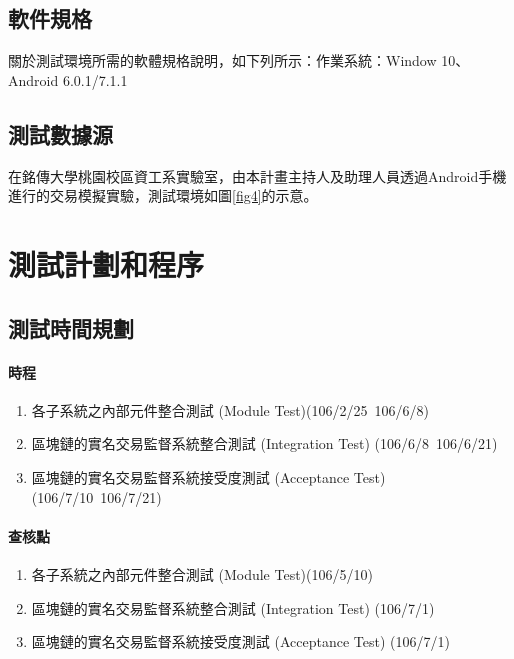  		\subsection{軟件規格}
 		關於測試環境所需的軟體規格說明，如下列所示：作業系統：Window 10、Android 6.0.1/7.1.1

 		\subsection{測試數據源}
 		在銘傳大學桃園校區資工系實驗室，由本計畫主持人及助理人員透過Android手機進行的交易模擬實驗，測試環境如圖\ref{fig4}的示意。

 	\section{測試計劃和程序}

 		\subsection{測試時間規劃}

 		\paragraph{時程}

 			\begin{enumerate}
 				\item 各子系統之內部元件整合測試 (Module Test)(106/2/25~106/6/8)
 				\item 區塊鏈的實名交易監督系統整合測試 (Integration Test) (106/6/8~106/6/21)
 				\item 區塊鏈的實名交易監督系統接受度測試 (Acceptance Test) (106/7/10~106/7/21)
			\end{enumerate}

		\paragraph{查核點}

			\begin{enumerate}
 				\item 各子系統之內部元件整合測試 (Module Test)(106/5/10)
 				\item 區塊鏈的實名交易監督系統整合測試 (Integration Test) (106/7/1)
 				\item 區塊鏈的實名交易監督系統接受度測試 (Acceptance Test) (106/7/1)
 			\end{enumerate}

